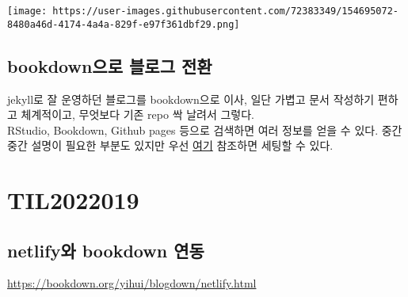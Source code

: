 \documentclass[
]{book}
\begin{document}
\texttt{[image: https://user-images.githubusercontent.com/72383349/154695072-8480a46d-4174-4a4a-829f-e97f361dbf29.png]}

\hypertarget{bookdownuxc73cuxb85c-uxbe14uxb85cuxadf8-uxc804uxd658}{%
\subsection{bookdown으로 블로그 전환}\label{bookdownuxc73cuxb85c-uxbe14uxb85cuxadf8-uxc804uxd658}}

jekyll로 잘 운영하던 블로그를 bookdown으로 이사, 일단 가볍고 문서 작성하기 편하고 체계적이고, 무엇보다 기존 repo 싹 날려서 그렇다.\\
RStudio, Bookdown, Github pages 등으로 검색하면 여러 정보를 얻을 수 있다. 중간중간 설명이 필요한 부분도 있지만 우선 \href{https://unfinishedgod.netlify.app/2020/08/04/bookdowngithub-page\%EC\%97\%90-publish\%ED\%95\%98\%EA\%B8\%B0/}{여기} 참조하면 세팅할 수 있다.

\hypertarget{til2022019}{%
\section{TIL2022019}\label{til2022019}}

\hypertarget{netlifyuxc640-bookdown-uxc5f0uxb3d9}{%
\subsection{netlify와 bookdown 연동}\label{netlifyuxc640-bookdown-uxc5f0uxb3d9}}

\url{https://bookdown.org/yihui/blogdown/netlify.html}

  
\end{document}
